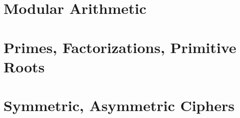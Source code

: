 \section{Modular Arithmetic}
\section{Primes, Factorizations, Primitive Roots}
\section{Symmetric, Asymmetric Ciphers}